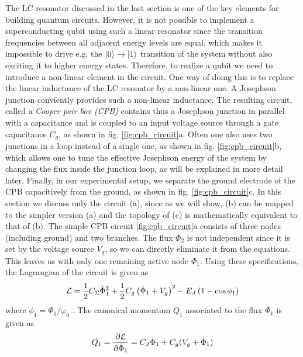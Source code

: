 The LC resonator discussed in the last section is one of the key elements for building quantum circuits. However, it is not possible to implement a superconducting qubit using such a linear resonator since the transition frequencies between all adjacent energy levels are equal, which makes it impossible to drive e.g. the $\left| 0 \right>\to\left| 1 \right>$ transition of the system without also exciting it to higher energy states. Therefore, to realize a qubit we need to introduce a non-linear element in the circuit. One way of doing this is to replace the linear inductance of the LC resonator by a non-linear one. A Josephson junction conviently provides such a non-linear inductance. The resulting circuit, called a {\it Cooper pair box (CPB)} contains thus a Josephson junction in parallel with a capacitance and is coupled to an input voltage source through a gate capacitance $C_g$, as shown in fig. \ref{fig:cpb_circuit}a. Often one also uses two junctions in a loop instead of a single one, as shown in fig. \ref{fig:cpb_circuit}b, which allows one to tune the effective Josephson energy of the system by changing the flux inside the junction loop, as will be explained in more detail later. Finally, in our experimental setup, we separate the ground electrode of the CPB capacitively from the ground, as shown in fig. \ref{fig:cpb_circuit}c. In this section we discuss only the circuit (a), since as we will show, (b) can be mapped to the simpler version (a) and the topology of (c) is mathematically equivalent to that of (b). The simple CPB circuit \ref{fig:cpb_circuit}a consists of  three nodes (including ground) and two branches. The flux $\Phi_2$ is not independent since it is set by the voltage source $V_g$, so we can directly eliminate it from the equations. This leaves us with only one remaining active node $\Phi_1$. Using these specifications, the Lagrangian of the circuit is given as
%
\begin{equation}
\begin{mathcal}L\end{mathcal}=\frac{1}{2}C_\Sigma\dot{\Phi}_1^2+\frac{1}{2}C_g\left(\dot{\Phi}_1+V_g\right)^2-E_J\left(1-\cos{\phi_1}\right)
\end{equation}
%
where $\phi_1=\Phi_1/\varphi_0$ . The canonical momentum $Q_1$ associated to the flux $\Phi_1$ is given as
%
\begin{equation}
Q_1 = \frac{\partial \begin{mathcal}L\end{mathcal}}{\partial \dot{\Phi}_1} = C_J \dot{\Phi}_1+C_g(V_g+\dot{\Phi}_1) \label{eq:q_of_phi}
\end{equation}
